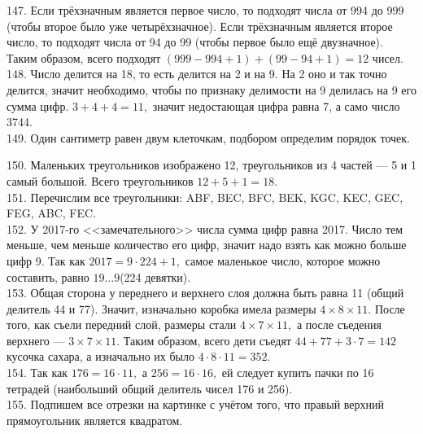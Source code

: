 \documentclass[12pt]{article}
\begin{document}
147. Если трёхзначным является первое число, то подходят числа от 994 до 999 (чтобы второе было уже четырёхзначное). Если трёхзначным является второе число, то подходят числа от 94 до 99 (чтобы первое было ещё двузначное). Таким образом, всего подходят $(999-994+1)+(99-94+1)=12$ чисел.\\
148. Число делится на 18, то есть делится на 2 и на 9. На 2 оно и так точно делится, значит необходимо, чтобы по признаку делимости на 9 делилась на 9 его сумма цифр. $3+4+4=11,$ значит недостающая цифра равна 7, а само число 3744.\\
149. Один сантиметр равен двум клеточкам, подбором определим порядок точек.
\begin{center}
\begin{figure}[ht!]
\end{figure}
\end{center}
150. Маленьких треугольников изображено 12, треугольников из 4 частей --- 5 и 1 самый большой. Всего треугольников $12+5+1=18.$\\
151. Перечислим все треугольники: ABF, BEC, BFC, BEK, KGC, KEC, GEC, FEG, ABC, FEC.\\
152. У 2017-го <<замечательного>> числа сумма цифр равна 2017. Число тем меньше, чем меньше количество его цифр, значит надо взять как можно больше цифр 9. Так как
$2017=9\cdot224+1,$ самое маленькое число, которое можно составить, равно $19\ldots9$(224 девятки).\\
153. Общая сторона у переднего и верхнего слоя должна быть равна 11 (общий делитель 44 и 77). Значит, изначально коробка имела размеры $4\times8\times11.$ После того, как съели передний слой, размеры стали $4\times7\times11,$ а после съедения верхнего --- $3\times7\times11.$ Таким образом, всего дети съедят $44+77+3\cdot7=142$ кусочка сахара, а изначально их было $4\cdot8\cdot11=352.$\\
154. Так как $176=16\cdot11,$ а $256=16\cdot16,$ ей следует купить пачки по 16 тетрадей (наибольший общий делитель чисел 176 и 256).\\
155. Подпишем все отрезки на картинке с учётом того, что правый верхний прямоугольник является квадратом.
\end{document}
